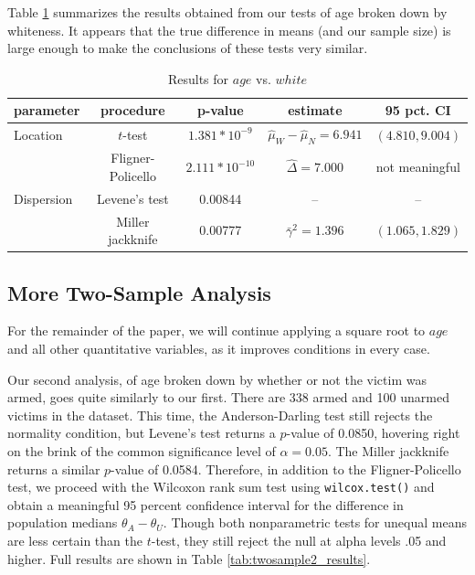 \par \bigskip Table \ref{tab:twosample1_results} summarizes the results obtained from our tests of age broken down by whiteness. It appears that the true difference in means (and our sample size) is large enough to make the conclusions of these tests very similar. 

\vspace{.2in}

\begin{table}[h]
    \centering
    \begin{tabular}{|l|c|c|c|c|}
        \hline
        \textbf{parameter} & \textbf{procedure} & \textbf{p-value} & \textbf{estimate} & \textbf{95 pct. CI}\\
        \hline
        Location & $t$-test & $1.381*10^{-9}$ & $\hat{\mu}_W-\hat{\mu}_N = 6.941$ & $(4.810, 9.004)$\\
        & Fligner-Policello & $2.111*10^{-10}$ & $\hat{\Delta} = 7.000$ & not meaningful\\
        \hline
        Dispersion & Levene's test & 0.00844 & -- & --\\
        & Miller jackknife & 0.00777 & $\bar{\gamma}^2 = 1.396$ & $(1.065, 1.829)$\\
        \hline
    \end{tabular}
    \caption{Results for $age$ vs. $white$}
    \label{tab:twosample1_results}
\end{table}

\subsection{More Two-Sample Analysis}

\par For the remainder of the paper, we will continue applying a square root to $age$ and all other quantitative variables, as it improves conditions in every case.

\par \bigskip Our second analysis, of age broken down by whether or not the victim was armed, goes quite similarly to our first. There are 338 armed and 100 unarmed victims in the dataset. This time, the Anderson-Darling test still rejects the normality condition, but Levene's test returns a $p$-value of 0.0850, hovering right on the brink of the common significance level of $\alpha = 0.05$. The Miller jackknife returns a similar $p$-value of 0.0584. Therefore, in addition to the Fligner-Policello test, we proceed with the Wilcoxon rank sum test using \texttt{wilcox.test()} and obtain a meaningful 95 percent confidence interval for the difference in population medians $\theta_{A}-\theta_{U}$. Though both nonparametric tests for unequal means are less certain than the $t$-test, they still reject the null at alpha levels .05 and higher. Full results are shown in Table \ref{tab:twosample2_results}.

